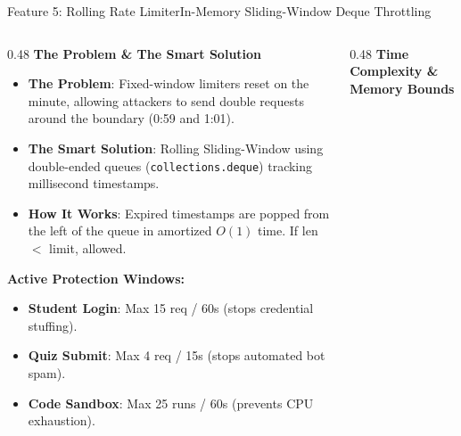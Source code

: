\documentclass[aspectratio=169,10pt]{beamer}
\begin{document}
\begin{frame}[fragile,t]{Feature 5: Rolling Rate Limiter}{In-Memory Sliding-Window Deque Throttling}
  \begin{columns}[t]
    \begin{column}{0.48\textwidth}
      {\fontsize{9.0}{11.0}\selectfont\textbf{\textcolor{KoinexaRed}{The Problem \& The Smart Solution}}}\par\vspace{1.5pt}
      \begin{itemize}\setlength{\itemsep}{1.2pt}
        \item {\fontsize{8.0}{9.8}\selectfont \textbf{The Problem}: Fixed-window limiters reset on the minute, allowing attackers to send double requests around the boundary (0:59 and 1:01).}
        \item {\fontsize{8.0}{9.8}\selectfont \textbf{The Smart Solution}: Rolling Sliding-Window using double-ended queues (\texttt{collections.deque}) tracking millisecond timestamps.}
        \item {\fontsize{8.0}{9.8}\selectfont \textbf{How It Works}: Expired timestamps are popped from the left of the queue in amortized $O(1)$ time. If len $<$ limit, allowed.}
      \end{itemize}
      \vspace{0.1cm}
      {\fontsize{8.0}{10.0}\selectfont\textbf{\textcolor{KoinexaOrange}{Active Protection Windows:}}}
      \begin{itemize}\setlength{\itemsep}{0.8pt}
        \item {\fontsize{7.5}{9.2}\selectfont \textbf{Student Login}: Max 15 req / 60s (stops credential stuffing).}
        \item {\fontsize{7.5}{9.2}\selectfont \textbf{Quiz Submit}: Max 4 req / 15s (stops automated bot spam).}
        \item {\fontsize{7.5}{9.2}\selectfont \textbf{Code Sandbox}: Max 25 runs / 60s (prevents CPU exhaustion).}
      \end{itemize}
    \end{column}
    \begin{column}{0.48\textwidth}
      {\fontsize{9.0}{11.0}\selectfont\textbf{\textcolor{KoinexaOrange}{Time Complexity \& Memory Bounds}}}\par\vspace{1.5pt}

\end{column}
\end{columns}
\end{frame}
\end{document}
